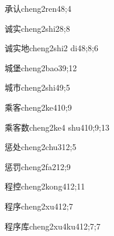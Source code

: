 \begin{verbete}{承认}{cheng2ren4}{8;4}
\end{verbete}

\begin{verbete}{诚实}{cheng2shi2}{8;8}
\end{verbete}

\begin{verbete}{诚实地}{cheng2shi2 di4}{8;8;6}
\end{verbete}

\begin{verbete}{城堡}{cheng2bao3}{9;12}
\end{verbete}

\begin{verbete}{城市}{cheng2shi4}{9;5}
\end{verbete}

\begin{verbete}{乘客}{cheng2ke4}{10;9}
\end{verbete}

\begin{verbete}{乘客数}{cheng2ke4 shu4}{10;9;13}
\end{verbete}

\begin{verbete}{惩处}{cheng2chu3}{12;5}
\end{verbete}

\begin{verbete}{惩罚}{cheng2fa2}{12;9}
\end{verbete}

\begin{verbete}{程控}{cheng2kong4}{12;11}
\end{verbete}

\begin{verbete}{程序}{cheng2xu4}{12;7}
\end{verbete}

\begin{verbete}{程序库}{cheng2xu4ku4}{12;7;7}
\end{verbete}


